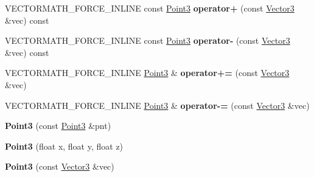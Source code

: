 \begin{DoxyCompactItemize}
\mbox{\label{classVectormath_1_1Aos_1_1Point3_a563239a9cebed60856f621adaab15d13}} 
V\+E\+C\+T\+O\+R\+M\+A\+T\+H\+\_\+\+F\+O\+R\+C\+E\+\_\+\+I\+N\+L\+I\+NE const \hyperlink{classVectormath_1_1Aos_1_1Point3}{Point3} {\bfseries operator+} (const \hyperlink{classVectormath_1_1Aos_1_1Vector3}{Vector3} \&vec) const
\item 
\mbox{\label{classVectormath_1_1Aos_1_1Point3_afb119a0bf9f478cf9810668b5c579940}} 
V\+E\+C\+T\+O\+R\+M\+A\+T\+H\+\_\+\+F\+O\+R\+C\+E\+\_\+\+I\+N\+L\+I\+NE const \hyperlink{classVectormath_1_1Aos_1_1Point3}{Point3} {\bfseries operator-\/} (const \hyperlink{classVectormath_1_1Aos_1_1Vector3}{Vector3} \&vec) const
\item 
\mbox{\label{classVectormath_1_1Aos_1_1Point3_a2664dac684d9760df08aa1ac58f7179c}} 
V\+E\+C\+T\+O\+R\+M\+A\+T\+H\+\_\+\+F\+O\+R\+C\+E\+\_\+\+I\+N\+L\+I\+NE \hyperlink{classVectormath_1_1Aos_1_1Point3}{Point3} \& {\bfseries operator+=} (const \hyperlink{classVectormath_1_1Aos_1_1Vector3}{Vector3} \&vec)
\item 
\mbox{\label{classVectormath_1_1Aos_1_1Point3_a997776eba517a8f237f5f0e3c48890e1}} 
V\+E\+C\+T\+O\+R\+M\+A\+T\+H\+\_\+\+F\+O\+R\+C\+E\+\_\+\+I\+N\+L\+I\+NE \hyperlink{classVectormath_1_1Aos_1_1Point3}{Point3} \& {\bfseries operator-\/=} (const \hyperlink{classVectormath_1_1Aos_1_1Vector3}{Vector3} \&vec)
\item 
\mbox{\label{classVectormath_1_1Aos_1_1Point3_a03dfaf1fbce8f78dc3569e57034a3fc8}} 
{\bfseries Point3} (const \hyperlink{classVectormath_1_1Aos_1_1Point3}{Point3} \&pnt)
\item 
\mbox{\label{classVectormath_1_1Aos_1_1Point3_a74641a8ac1d99934fea99880a06b58db}} 
{\bfseries Point3} (float x, float y, float z)
\item 
\mbox{\label{classVectormath_1_1Aos_1_1Point3_a0b286492bfd84978c68d9c89c3756596}} 
{\bfseries Point3} (const \hyperlink{classVectormath_1_1Aos_1_1Vector3}{Vector3} \&vec)
\item 
\mbox{\label{classVectormath_1_1Aos_1_1Point3_a52800d18e22d003682c5c2bc9dd3cef4}} 

\end{DoxyCompactItemize}
